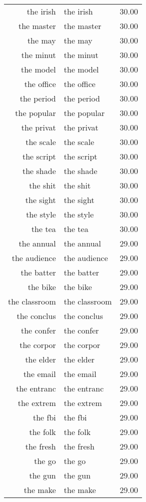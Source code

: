 \begin{table}[ht]
\begin{tabular}{rlr}
  the irish & the irish & 30.00 \\ 
  the master & the master & 30.00 \\ 
  the may & the may & 30.00 \\ 
  the minut & the minut & 30.00 \\ 
  the model & the model & 30.00 \\ 
  the office & the office & 30.00 \\ 
  the period & the period & 30.00 \\ 
  the popular & the popular & 30.00 \\ 
  the privat & the privat & 30.00 \\ 
  the scale & the scale & 30.00 \\ 
  the script & the script & 30.00 \\ 
  the shade & the shade & 30.00 \\ 
  the shit & the shit & 30.00 \\ 
  the sight & the sight & 30.00 \\ 
  the style & the style & 30.00 \\ 
  the tea & the tea & 30.00 \\ 
  the annual & the annual & 29.00 \\ 
  the audience & the audience & 29.00 \\ 
  the batter & the batter & 29.00 \\ 
  the bike & the bike & 29.00 \\ 
  the classroom & the classroom & 29.00 \\ 
  the conclus & the conclus & 29.00 \\ 
  the confer & the confer & 29.00 \\ 
  the corpor & the corpor & 29.00 \\ 
  the elder & the elder & 29.00 \\ 
  the email & the email & 29.00 \\ 
  the entranc & the entranc & 29.00 \\ 
  the extrem & the extrem & 29.00 \\ 
  the fbi & the fbi & 29.00 \\ 
  the folk & the folk & 29.00 \\ 
  the fresh & the fresh & 29.00 \\ 
  the go & the go & 29.00 \\ 
  the gun & the gun & 29.00 \\ 
  the make & the make & 29.00 \\ 

\end{tabular}
\end{table}
